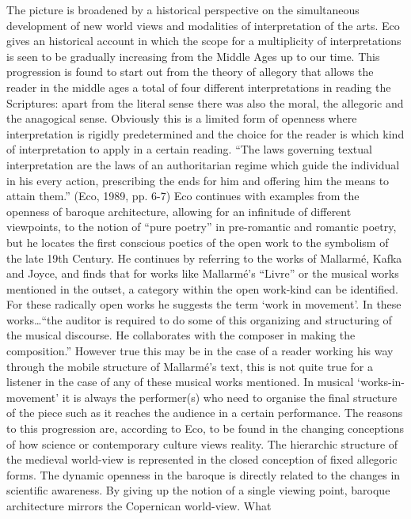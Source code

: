 The picture is broadened by a historical perspective on the
simultaneous development of new world views and modalities of
interpretation of the arts. Eco gives an historical account in which
the scope for a multiplicity of interpretations is seen to be
gradually increasing from the Middle Ages up to our time. This
progression is found to start out from the theory of allegory that
allows the reader in the middle ages a total of four different
interpretations in reading the Scriptures: apart from the literal
sense there was also the moral, the allegoric and the anagogical
sense. Obviously this is a limited form of openness where
interpretation is rigidly predetermined and the choice for the reader
is which kind of interpretation to apply in a certain reading. ``The
laws governing textual interpretation are the laws of an authoritarian
regime which guide the individual in his every action, prescribing the
ends for him and offering him the means to attain them.'' (Eco, 1989,
pp. 6-7) Eco continues with examples from the openness of baroque
architecture, allowing for an infinitude of different viewpoints, to
the notion of ``pure poetry'' in pre-romantic and romantic poetry, but
he locates the first conscious poetics of the open work to the
symbolism of the late 19th Century. He continues by referring to the
works of Mallarmé, Kafka and Joyce, and finds that for works like
Mallarmé's ``Livre'' or the musical works mentioned in the outset, a
category within the open work-kind can be identified. For these
radically open works he suggests the term `work in movement'. In these
works\ldots ``the auditor is required to do some of this organizing and
structuring of the musical discourse. He collaborates with the
composer in making the composition.'' However true this may be in the
case of a reader working his way through the mobile structure of
Mallarmé's text, this is not quite true for a listener in the case of
any of these musical works mentioned. In musical `works-in-movement'
it is always the performer(s) who need to organise the final structure
of the piece such as it reaches the audience in a certain performance.
The reasons to this progression are, according to Eco, to be found in
the changing conceptions of how science or contemporary culture views
reality. The hierarchic structure of the medieval world-view is
represented in the closed conception of fixed allegoric forms. The
dynamic openness in the baroque is directly related to the changes in
scientific awareness. By giving up the notion of a single viewing
point, baroque architecture mirrors the Copernican world-view. What
